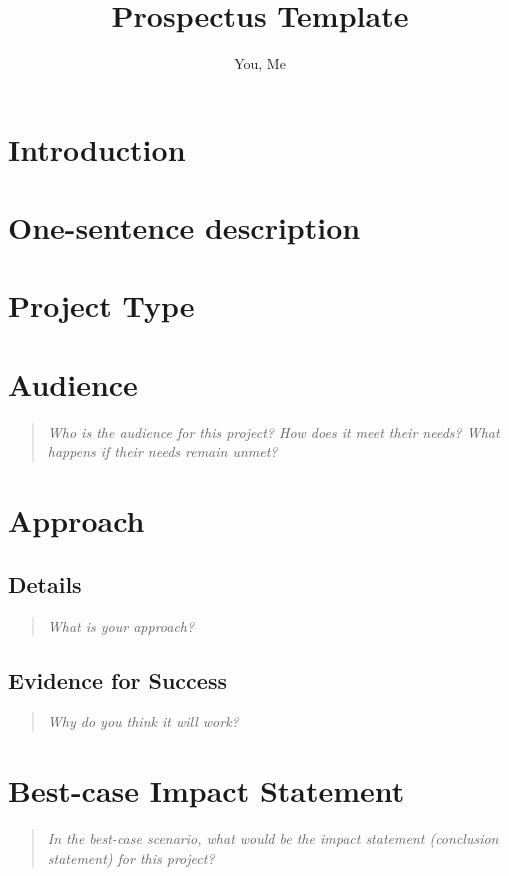 \documentclass{proc}
\begin{document}
\title{Prospectus Template}

\author{You, Me}

\maketitle

\section{Introduction}

\section{One-sentence description}

\section{Project Type}

\section{Audience} 
\begin{quote}
\textit{Who is the audience for this project? 
How does it meet their needs? 
What happens if their needs remain unmet?}
\end{quote}

\section{Approach}
\subsection{Details}
\begin{quote}
\textit{What is your approach?}
\end{quote}

\subsection{Evidence for Success}
\begin{quote}
\textit{Why do you think it will work?} 
\end{quote}


\section{Best-case Impact Statement}
\begin{quote}
\textit{In the best-case scenario, what would be the impact statement (conclusion statement) for this project? \cite{wijk2005value, pike2009science}}
\end{quote}
\end{document}

